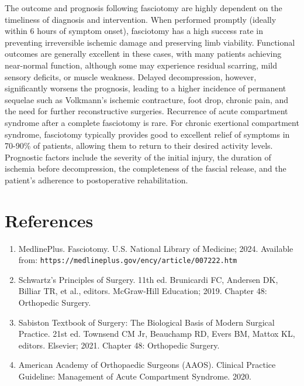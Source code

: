 The outcome and prognosis following fasciotomy are highly dependent on the timeliness of diagnosis and intervention. When performed promptly (ideally within 6 hours of symptom onset), fasciotomy has a high success rate in preventing irreversible ischemic damage and preserving limb viability. Functional outcomes are generally excellent in these cases, with many patients achieving near-normal function, although some may experience residual scarring, mild sensory deficits, or muscle weakness. Delayed decompression, however, significantly worsens the prognosis, leading to a higher incidence of permanent sequelae such as Volkmann's ischemic contracture, foot drop, chronic pain, and the need for further reconstructive surgeries. Recurrence of acute compartment syndrome after a complete fasciotomy is rare. For chronic exertional compartment syndrome, fasciotomy typically provides good to excellent relief of symptoms in 70-90\% of patients, allowing them to return to their desired activity levels. Prognostic factors include the severity of the initial injury, the duration of ischemia before decompression, the completeness of the fascial release, and the patient's adherence to postoperative rehabilitation.

\section*{References}
\begin{enumerate}
  \item MedlinePlus. Fasciotomy. U.S. National Library of Medicine; 2024. Available from: \texttt{https://medlineplus.gov/ency/article/007222.htm}
  \item Schwartz's Principles of Surgery. 11th ed. Brunicardi FC, Andersen DK, Billiar TR, et al., editors. McGraw-Hill Education; 2019. Chapter 48: Orthopedic Surgery.
  \item Sabiston Textbook of Surgery: The Biological Basis of Modern Surgical Practice. 21st ed. Townsend CM Jr, Beauchamp RD, Evers BM, Mattox KL, editors. Elsevier; 2021. Chapter 48: Orthopedic Surgery.
  \item American Academy of Orthopaedic Surgeons (AAOS). Clinical Practice Guideline: Management of Acute Compartment Syndrome. 2020.
\end{enumerate}

\clearpage
